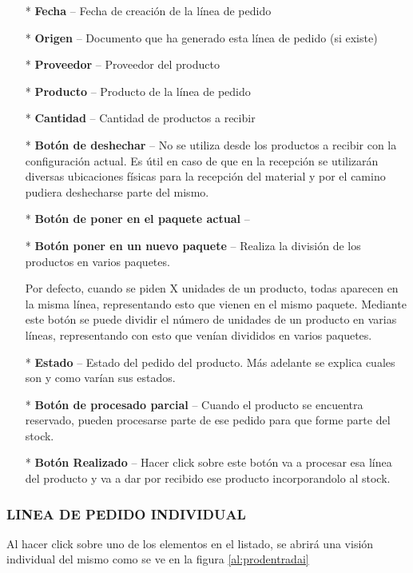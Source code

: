 \begin{itemize}
  \item[*]\textbf{Fecha} -- Fecha de creación de la línea de pedido
  \item[*]\textbf{Origen} -- Documento que ha generado esta línea de pedido (si existe)
  \item[*]\textbf{Proveedor} -- Proveedor del producto
  \item[*]\textbf{Producto} -- Producto de la línea de pedido
  \item[*]\textbf{Cantidad} -- Cantidad de productos a recibir
  \item[*]\textbf{Botón de deshechar} -- No se utiliza desde los productos a recibir con la configuración actual. Es útil en caso de que en la recepción se utilizarán diversas ubicaciones físicas para la recepción del material y por el camino pudiera deshecharse parte del mismo.
  \item[*]\textbf{Botón de poner en el paquete actual} -- 
  \item[*]\textbf{Botón poner en un nuevo paquete} -- Realiza la división de los productos en varios paquetes.

Por defecto, cuando se piden X unidades de un producto, todas aparecen en la misma línea, representando esto que vienen en el mismo paquete. Mediante este botón se puede dividir el número de unidades de un producto en varias líneas, representando con esto que venían divididos en varios paquetes.

  \item[*]\textbf{Estado} -- Estado del pedido del producto. Más adelante se explica cuales son y como varían sus estados.

  \item[*]\textbf{Botón de procesado parcial} -- Cuando el producto se encuentra reservado, pueden procesarse parte de ese pedido para que forme parte del stock.

  \item[*]\textbf{Botón Realizado} -- Hacer click sobre este botón va a procesar esa línea del producto y va a dar por recibido ese producto incorporandolo al stock.

\end{itemize}


\subsubsection{LINEA DE PEDIDO INDIVIDUAL}

Al hacer click sobre uno de los elementos en el listado, se abrirá una visión individual del mismo como se ve en la figura \ref{al:prodentradai}

